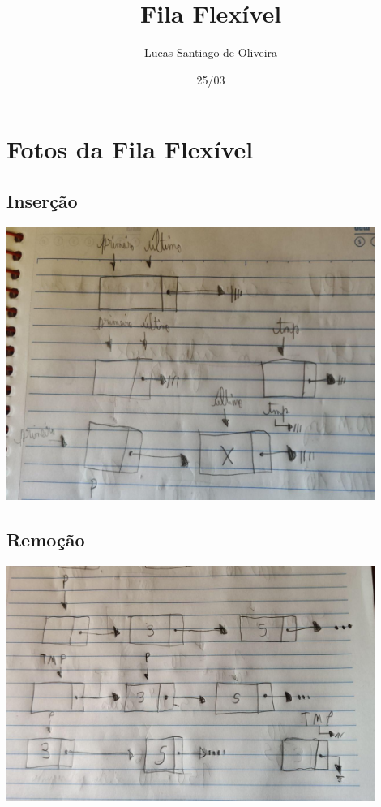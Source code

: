 \documentclass{article}
\title{Fila Flexível}
\author{Lucas Santiago de Oliveira}
\date{25/03}
\begin{document}
\maketitle
\section{Fotos da Fila Flexível}
\subsection{Inserção}
\begin{center}
    \includegraphics[width=12cm]{Fotos/insercao.jpg}
\end{center}

\subsection{Remoção}
\begin{center}
    \includegraphics[width=12cm]{Fotos/remocao.jpg}
\end{center}    
\end{document}

